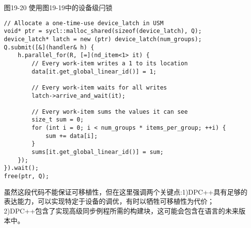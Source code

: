 \hspace*{\fill} \par %
图19-20 使用图19-19中的设备级闩锁
\begin{lstlisting}[caption={}]
// Allocate a one-time-use device_latch in USM
void* ptr = sycl::malloc_shared(sizeof(device_latch), Q);
device_latch* latch = new (ptr) device_latch(num_groups);
Q.submit([&](handler& h) {
	h.parallel_for(R, [=](nd_item<1> it) {
		// Every work-item writes a 1 to its location
		data[it.get_global_linear_id()] = 1;
		
		// Every work-item waits for all writes
		latch->arrive_and_wait(it);
		
		// Every work-item sums the values it can see
		size_t sum = 0;
		for (int i = 0; i < num_groups * items_per_group; ++i) {
			sum += data[i];
		}
		sums[it.get_global_linear_id()] = sum;
	});
}).wait();
free(ptr, Q);
\end{lstlisting}

虽然这段代码不能保证可移植性，但在这里强调两个关键点:1)DPC++具有足够的表达能力，可以实现特定于设备的调优，有时以牺牲可移植性为代价；2)DPC++包含了实现高级同步例程所需的构建块，这可能会包含在语言的未来版本中。\par









































